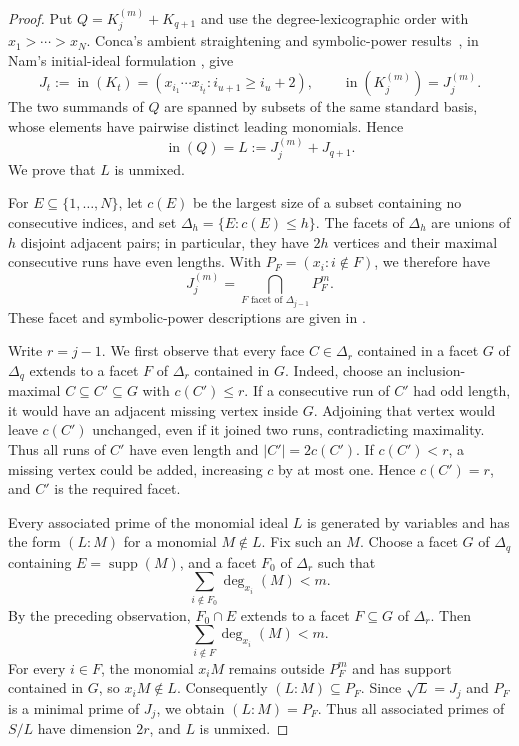 \documentclass[11pt,reqno]{amsart}
\numberwithin{equation}{subsection}
\theoremstyle{definition}
\theoremstyle{remark}
\begin{document}
\begin{proof}
Put $Q=K_j^{(m)}+K_{q+1}$ and use the degree-lexicographic
order with $x_1>\cdots>x_N$. Conca's ambient straightening
and symbolic-power results~\cite{ConcaHankel}, in Nam's
initial-ideal formulation
\cite[Corollary~3.9, Theorem~3.12, and Corollary~3.21]{Nam},
give
\[
 J_t:=\operatorname{in}(K_t)
   =(x_{i_1}\cdots x_{i_t}:i_{u+1}\ge i_u+2),
 \qquad
 \operatorname{in}(K_j^{(m)})=J_j^{(m)}.
\]
The two summands of $Q$ are spanned by subsets of the same
standard basis, whose elements have pairwise distinct leading
monomials. Hence 
\begin{equation}\label{eq:hankel-initial-sum}
 \operatorname{in}(Q)=L:=J_j^{(m)}+J_{q+1}.
\end{equation}
We prove that $L$ is unmixed.

For $E\subseteq\{1,\ldots,N\}$, let $c(E)$ be the largest
size of a subset containing no consecutive indices, and set
$\Delta_h=\{E:c(E)\le h\}$.
The facets of $\Delta_h$ are unions of $h$ disjoint adjacent
pairs; in particular, they have $2h$ vertices and their
maximal consecutive runs have even lengths.
With $P_F=(x_i:i\notin F)$, we therefore have
\[
 J_j^{(m)}
 =\bigcap_{F\text{ facet of }\Delta_{j-1}}P_F^m.
\]
These facet and symbolic-power descriptions are given in
\cite[proof of Theorem~3.12]{Nam}.

Write $r=j-1$. We first observe that every face
$C\in\Delta_r$ contained in a facet $G$ of $\Delta_q$
extends to a facet $F$ of $\Delta_r$ contained in $G$.
Indeed, choose an inclusion-maximal
$C\subseteq C'\subseteq G$ with $c(C')\le r$.
If a consecutive run of $C'$ had odd length, it would have
an adjacent missing vertex inside $G$. Adjoining that vertex
would leave $c(C')$ unchanged, even if it joined two runs,
contradicting maximality. Thus all runs of $C'$ have even
length and $|C'|=2c(C')$.
If $c(C')<r$, a missing vertex could be added, increasing
$c$ by at most one. Hence $c(C')=r$, and $C'$ is the
required facet.

Every associated prime of the monomial ideal $L$ is generated
by variables and has the form $(L:M)$ for a monomial
$M\notin L$. Fix such an $M$.
Choose a facet $G$ of $\Delta_q$ containing
$E=\operatorname{supp}(M)$, and a facet $F_0$ of $\Delta_r$
such that
\[
 \sum_{i\notin F_0}\deg_{x_i}(M)<m.
\]
By the preceding observation, $F_0\cap E$ extends to a facet
$F\subseteq G$ of $\Delta_r$. Then
\[
 \sum_{i\notin F}\deg_{x_i}(M)<m.
\]
For every $i\in F$, the monomial $x_iM$ remains outside
$P_F^m$ and has support contained in $G$, so $x_iM\notin L$.
Consequently $(L:M)\subseteq P_F$.
Since $\sqrt L=J_j$ and $P_F$ is a minimal prime of $J_j$,
we obtain $(L:M)=P_F$.
Thus all associated primes of $S/L$ have dimension $2r$,
and $L$ is unmixed.


\end{proof}
\end{document}
